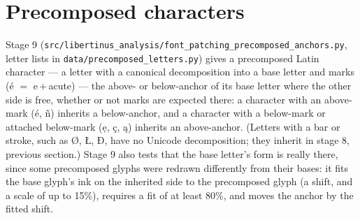 \documentclass[landscape]{article}
\begin{document}




\newpage
\section*{Precomposed characters}

Stage 9 (\verb|src/libertinus_analysis/font_patching_precomposed_anchors.py|, letter lists in \verb|data/precomposed_letters.py|)
gives a precomposed Latin character --- a letter with a canonical decomposition into a base letter and marks (é $=$ e\,+\,acute) --- 
the above- or below-anchor of its base letter where the other side is free, whether or not marks are expected there:
a character with an above-mark (é, ñ) inherits a below-anchor, and a character with a below-mark or attached below-mark (ẹ, ç, ą) inherits an above-anchor.
(Letters with a bar or stroke, such as Ø, Ł, Đ, have no Unicode decomposition; they inherit in stage 8, previous section.)
Stage 9 also tests that the base letter's form is really there, since some precomposed glyphs were redrawn differently from their bases:
it fits the base glyph's ink on the inherited side to the precomposed glyph (a shift, and a scale of up to 15\%), requires a fit of at least 80\%,
and moves the anchor by the fitted shift.
\end{document}
